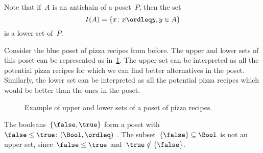 \begin{remark}
Note that if~$A$ is an antichain of a poset~$P$, then the set
\begin{equation}
    I(A)=\{x\colon x\ordleq y, y\in A\}
\end{equation}
is a lower set of~$P$.
\end{remark}

Consider the blue poset of pizza recipes from before. The upper and lower sets of this poset can be represented as in~\cref{fig:upperset}. The upper set can be interpreted as all the potential pizza recipes for which we can find better alternatives in the poset. Similarly, the lower set can be interpreted as all the potential pizza recipes which would be better than the ones in the poset.

\begin{figure}[h!]
\begin{center}
\end{center}
\caption{Example of upper and lower sets of a poset of pizza recipes. \label{fig:upperset}}
\end{figure}
\begin{example}
The booleans~$\{\false, \true \}$ form a poset with~$\false \leq \true\colon(\Bool,\ordleq)$ . The subset~$\{\false\} \subseteq \Bool$ is not an upper set, since~$\false \leq \true$ and~$\true \notin \{\false \}$.	
\end{example}

